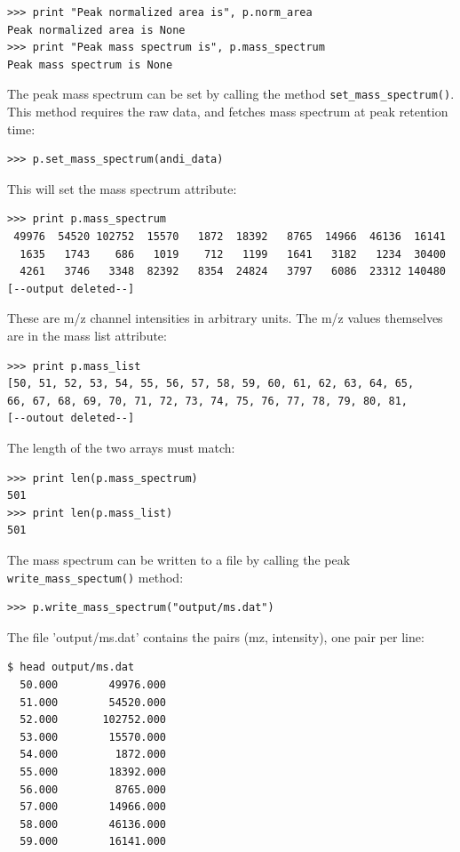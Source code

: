 \begin{verbatim}
>>> print "Peak normalized area is", p.norm_area
Peak normalized area is None
>>> print "Peak mass spectrum is", p.mass_spectrum
Peak mass spectrum is None
\end{verbatim}

\noindent
The peak mass spectrum can be set by calling the method {\tt set\_mass\_spectrum()}.
This method requires the raw data, and fetches mass spectrum at peak
retention time:

\begin{verbatim}
>>> p.set_mass_spectrum(andi_data)
\end{verbatim}

\noindent
This will set the mass spectrum attribute: 

\begin{verbatim}
>>> print p.mass_spectrum
 49976  54520 102752  15570   1872  18392   8765  14966  46136  16141
  1635   1743    686   1019    712   1199   1641   3182   1234  30400
  4261   3746   3348  82392   8354  24824   3797   6086  23312 140480
[--output deleted--]
\end{verbatim}

\noindent
These are m/z channel intensities in arbitrary units. The m/z values
themselves are in the mass list attribute:

\begin{verbatim}
>>> print p.mass_list
[50, 51, 52, 53, 54, 55, 56, 57, 58, 59, 60, 61, 62, 63, 64, 65,
66, 67, 68, 69, 70, 71, 72, 73, 74, 75, 76, 77, 78, 79, 80, 81,
[--outout deleted--]
\end{verbatim}

\noindent
The length of the two arrays must match:

\begin{verbatim}
>>> print len(p.mass_spectrum)
501
>>> print len(p.mass_list)
501
\end{verbatim}

The mass spectrum can be written to a file by calling the peak
{\tt write\_mass\_spectum()} method:

\begin{verbatim}
>>> p.write_mass_spectrum("output/ms.dat")
\end{verbatim}

\noindent
The file 'output/ms.dat' contains the pairs (mz, intensity), one pair
per line:

\begin{verbatim}
$ head output/ms.dat
  50.000        49976.000
  51.000        54520.000
  52.000       102752.000
  53.000        15570.000
  54.000         1872.000
  55.000        18392.000
  56.000         8765.000
  57.000        14966.000
  58.000        46136.000
  59.000        16141.000
\end{verbatim}

